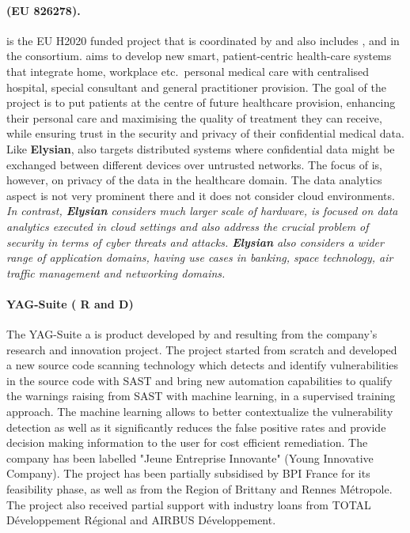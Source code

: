\documentclass[a4paper,11pt]{article}
\newcommand{\project}[1]{\textbf{#1}\xspace}
\newcommand{\SECURITY}{\project{Elysian}}
\newcommand{\TheProject}{\SECURITY}
\begin{document}
\begin{mdframed}[backgroundcolor=blue!5]
\paragraph{\serums (EU 826278).} \serums is the EU H2020 funded project that is coordinated by \USTANshort{} and also includes \SOPRAshort{}, \IBMshort{} and \SCCHshort{} in the consortium. \serums aims to develop new smart, patient-centric health-care systems that integrate home, workplace etc.~personal medical care with centralised hospital, special consultant and general practitioner provision. The goal of the \serums project is to put patients at the centre of future healthcare provision, enhancing their personal care and maximising the quality of treatment they can receive, while ensuring trust in the security and privacy of their confidential medical data. Like \TheProject{}, \serums also targets distributed systems where confidential data might be exchanged between different devices over untrusted networks. The focus of \serums is, however, on privacy of the data in the healthcare domain. The data analytics aspect is not very prominent there and it does not consider cloud environments. \emph{In contrast, \TheProject{} considers much larger scale of hardware, is focused on data analytics executed in cloud settings and also address the crucial problem of security in terms of cyber threats and attacks. \TheProject{} also considers a wider range of application domains, having use cases in banking, space technology, air traffic management and networking domains.}
\end{mdframed}


\begin{mdframed}[backgroundcolor=blue!5]
\paragraph{YAG-Suite (\YAGshort{} R and D) } The YAG-Suite a is product developed by \YAGshort{} and resulting from the company's research and innovation project. The project started from scratch and developed a new source code scanning technology which detects and identify vulnerabilities in the source code with SAST and bring new automation capabilities to qualify the warnings raising from SAST with machine learning, in a supervised training approach. The machine learning allows to better contextualize the vulnerability detection as well as it significantly reduces the false positive rates and provide decision making information to the user for cost efficient remediation.    
The company has been labelled "Jeune Entreprise Innovante" (Young Innovative Company). The project has been partially subsidised by BPI France for its feasibility phase, as well as from the Region of Brittany and Rennes Métropole. The project also received partial support with industry loans from TOTAL Développement Régional and AIRBUS Développement. 
\end{mdframed}
\end{document}
